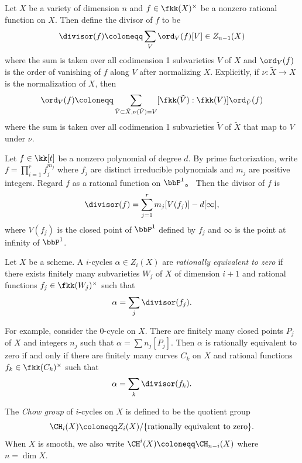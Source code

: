     \begin{definition}
        Let \(X\) be a variety of dimension \(n\) and \(f \in \fkk(X)^{\times}\) be a nonzero rational function on \(X\). 
        Then define the divisor of \(f\) to be
        \[ \divisor(f) \coloneqq \sum_{V} \ord_V(f) [V] \in Z_{n-1}(X) \]
        where the sum is taken over all codimension 1 subvarieties \(V\) of \(X\) and \(\ord_V(f)\) is the order of vanishing of \(f\) along \(V\) after normalizing \(X\).
        Explicitly, if \(\nu: \tilde{X} \to X\) is the normalization of \(X\), then 
        \[ \ord_V(f) \coloneqq \sum_{\tilde{V} \subset \tilde{X}, \nu(\tilde{V}) = V} [\fkk(\tilde{V}):\fkk(V)] \ord_{\tilde{V}}(f) \]
        where the sum is taken over all codimension 1 subvarieties \(\tilde{V}\) of \(\tilde{X}\) that map to \(V\) under \(\nu\).
    \end{definition}

    \begin{example}
        Let \(f \in \kk[t]\) be a nonzero polynomial of degree \(d\). 
        By prime factorization, write \(f = \prod_{i=1}^r f_j^{m_j}\) where \(f_j\) are distinct irreducible polynomials and \(m_j\) are positive integers. 
        Regard \(f\) as a rational function on \(\bbP^1\)。
        Then the divisor of \(f\) is
        \[ \divisor(f) = \sum_{j=1}^r m_j [V(f_j)] - d [\infty], \]
        where \(V(f_j)\) is the closed point of \(\bbP^1\) defined by \(f_j\) and \(\infty\) is the point at infinity of \(\bbP^1\).
    \end{example}

    \begin{definition}
        Let \(X\) be a scheme. 
        A \(i\)-cycles \(\alpha \in Z_i(X)\) are \emph{rationally equivalent to zero} 
        if there exists finitely many subvarieties \(W_j\) of \(X\) of dimension \(i+1\) and rational functions \(f_j \in \fkk(W_j)^{\times}\) such that
        \[ \alpha = \sum_j \divisor(f_j). \]
    \end{definition}

    For example, consider the \(0\)-cycle on \(X\).
    There are finitely many closed points \(P_j\) of \(X\) and integers \(n_j\) such that \(\alpha = \sum n_j [P_j]\). 
    Then \(\alpha\) is rationally equivalent to zero if and only if there are finitely many curves \(C_k\) on \(X\) and rational functions \(f_k \in \fkk(C_k)^{\times}\) such that
    \[ \alpha = \sum_k \divisor(f_k). \]

    \begin{definition}
        The \emph{Chow group} of \(i\)-cycles on \(X\) is defined to be the quotient group
        \[ \CH_i(X) \coloneqq Z_i(X) / \{\text{rationally equivalent to zero}\}. \]
        When \(X\) is smooth, we also write \(\CH^i(X) \coloneqq \CH_{n-i}(X)\) where \(n = \dim X\).
    \end{definition}


